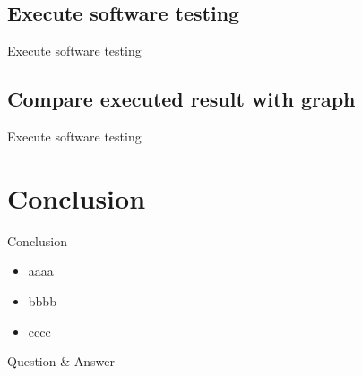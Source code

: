 \documentclass{beamer}
\begin{document}
\subsection{Execute software testing}
\begin{frame}{Execute software testing}
\end{frame}

\subsection{Compare executed result with graph}
\begin{frame}{Execute software testing}
\end{frame}

%
\section{Conclusion}
\begin{frame}{Conclusion}
    \begin{itemize}
        \item<1->aaaa
        \item<2->bbbb
        \item<3->cccc
    \end{itemize}
\end{frame}

%
\begin{frame}[standout]
    Question \& Answer
\end{frame}
\end{document}
